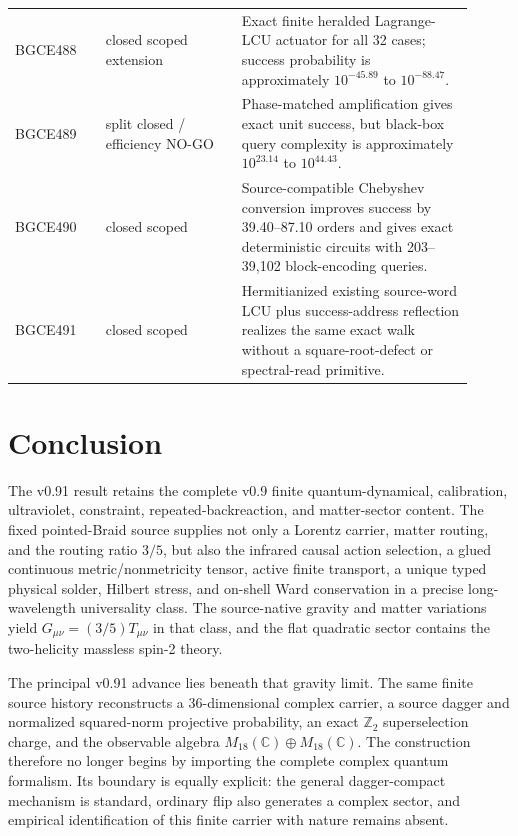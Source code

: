 \documentclass[11pt]{article}
\theoremstyle{definition}
\theoremstyle{remark}
\begin{document}
\begin{longtable}{>{\raggedright\arraybackslash}p{0.18\linewidth} >{\raggedright\arraybackslash}p{0.27\linewidth} >{\raggedright\arraybackslash}p{0.46\linewidth}}
BGCE488 & closed scoped extension & Exact finite heralded Lagrange-LCU actuator for all 32 cases; success probability is approximately $10^{-45.89}$ to $10^{-88.47}$. \\
BGCE489 & split closed / efficiency NO-GO & Phase-matched amplification gives exact unit success, but black-box query complexity is approximately $10^{23.14}$ to $10^{44.43}$. \\
BGCE490 & closed scoped & Source-compatible Chebyshev conversion improves success by 39.40--87.10 orders and gives exact deterministic circuits with 203--39,102 block-encoding queries. \\
BGCE491 & closed scoped & Hermitianized existing source-word LCU plus success-address reflection realizes the same exact walk without a square-root-defect or spectral-read primitive. \\
\bottomrule
\end{longtable}

\section{Conclusion}

The v0.91 result retains the complete v0.9 finite quantum-dynamical, calibration, ultraviolet, constraint, repeated-backreaction, and matter-sector content. The fixed pointed-Braid source supplies not only a Lorentz carrier, matter routing, and the routing ratio $3/5$, but also the infrared causal action selection, a glued continuous metric/nonmetricity tensor, active finite transport, a unique typed physical solder, Hilbert stress, and on-shell Ward conservation in a precise long-wavelength universality class. The source-native gravity and matter variations yield $G_{\mu\nu}=(3/5)T_{\mu\nu}$ in that class, and the flat quadratic sector contains the two-helicity massless spin-2 theory.

The principal v0.91 advance lies beneath that gravity limit. The same finite source history reconstructs a 36-dimensional complex carrier, a source dagger and normalized squared-norm projective probability, an exact $\mathbb Z_2$ superselection charge, and the observable algebra $M_{18}(\mathbb C)\oplus M_{18}(\mathbb C)$. The construction therefore no longer begins by importing the complete complex quantum formalism. Its boundary is equally explicit: the general dagger-compact mechanism is standard, ordinary flip also generates a complex sector, and empirical identification of this finite carrier with nature remains absent.
\end{document}
